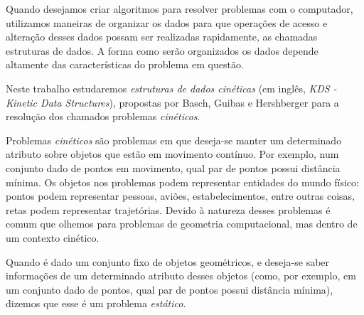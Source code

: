 

\label{cap:introducao}

\enlargethispage{.5\baselineskip}

Quando desejamos criar algoritmos para resolver problemas com o computador,
utilizamos maneiras de organizar os dados para que operações de acesso e
alteração desses dados possam ser realizadas rapidamente, as chamadas estruturas
de dados. A forma como serão organizados os dados depende altamente das
características do problema em questão.

Neste trabalho estudaremos \textit{estruturas de dados cinéticas} (em inglês,
\emph{KDS - Kinetic Data Structures}), propostas por Basch, Guibas e Hershberger
para a resolução dos chamados problemas \textit{cinéticos}.

Problemas \textit{cinéticos} são problemas em que deseja-se manter um
determinado atributo sobre objetos que estão em movimento contínuo. Por exemplo,
num conjunto dado de pontos em movimento, qual par de pontos possui distância
mínima. Os objetos nos problemas podem representar entidades do mundo físico:
pontos podem representar pessoas, aviões, estabelecimentos, entre outras coisas,
retas podem representar trajetórias. Devido à natureza desses problemas é comum
que olhemos para problemas de geometria computacional, mas dentro de um contexto
cinético.

Quando é dado um conjunto fixo de objetos geométricos, e deseja-se saber
informações de um determinado atributo desses objetos (como, por exemplo, em um
conjunto dado de pontos, qual par de pontos possui distância mínima), dizemos
que esse é um problema \textit{estático}.

